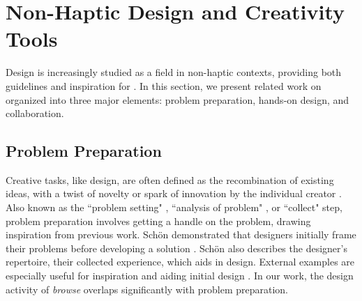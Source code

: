 


%
%
\section{Non-Haptic Design and Creativity Tools}
Design is increasingly studied as a field in non-haptic contexts, providing both guidelines and inspiration for \haxd.
In this section, we present related work on  organized into three major elements: problem preparation, hands-on design, and collaboration.

\subsection{Problem Preparation}
Creative tasks, like design, are often defined as the recombination of existing ideas, with a twist of novelty or spark of innovation by the individual creator \cite{Warr2005}.
Also known as the ``problem setting" \cite{Schon1982}, ``analysis of problem" \cite{Warr2005}, or ``collect" \cite{Shneiderman2000} step, problem preparation involves getting a handle on the problem,  drawing inspiration from previous work. %
Sch\"{o}n demonstrated that designers initially frame their problems before developing a solution \cite{Schon1982}.
Sch\"{o}n also describes the designer's repertoire, their collected experience, which aids in design.
External examples are especially useful for inspiration and aiding initial design \cite{Herring2009,Buxton2007}. 
In our work, the design activity of \emph{browse} overlaps significantly with problem preparation.

